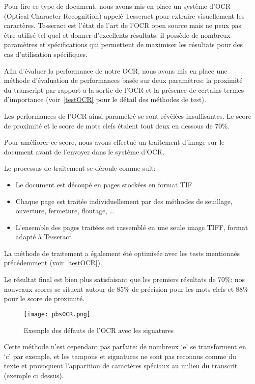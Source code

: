 Pour lire ce type de document, nous avons mis en place un système d'OCR (Optical Character Recognition) appelé Tesseract pour extraire visuellement les caractères.
Tesseract est l'état de l'art de l'OCR open source mais ne peux pas être utilisé tel quel et donner d'excellents résultats: il possède de nombreux paramètres et spécifications qui permettent de maximiser les résultats pour des cas d'utilisation spécifiques.

Afin d'évaluer la performance de notre OCR, nous avons mis en place une méthode d'évaluation de performances basée sur deux paramètres: la proximité du transcript par rapport a la sortie de l'OCR et la présence de certains termes d'importance (voir~\ref{testOCR} pour le détail des méthodes de test).

Les performances de l'OCR ainsi paramétré se sont révélées insuffisantes.
Le score de proximité et le score de mots clefs étaient tout deux en dessous de 70\%.


Pour améliorer ce score, nous avons effectué un traitement d'image sur le document avant de l'envoyer dans le système d'OCR\@.

Le processus de traitement se déroule comme suit:
\begin{itemize}
\item Le document est découpé en pages stockées en format TIF
\item Chaque page est traitée individuellement par des méthodes de seuillage, ouverture, fermeture, floutage, \ldots
\item L'ensemble des pages traitées est rassemblé en une seule image TIFF, format adapté à Tesseract
\end{itemize}

La méthode de traitement a également été optimisée avec les tests mentionnés précédemment (voir~\ref{testOCR}).

Le résultat final est bien plus satisfaisant que les premiers résultats de 70\%: nos nouveaux scores se situent autour de 85\% de précision pour les mots clefs et 88\% pour le score de proximité.

\begin{figure}[h!]
  \centering
  \texttt{[image: pbsOCR.png]}
	\caption[]{Exemple des défauts de l'OCR avec les signatures}
	\label{fig:defautsOCR}
\end{figure}

Cette méthode n'est cependant pas parfaite: de nombreux `e' se transforment en `c' par exemple, et les tampons et signatures ne sont pas reconnus comme du texte et provoquent l'apparition de caractères spéciaux au milieu du transcrit (exemple ci dessus).

